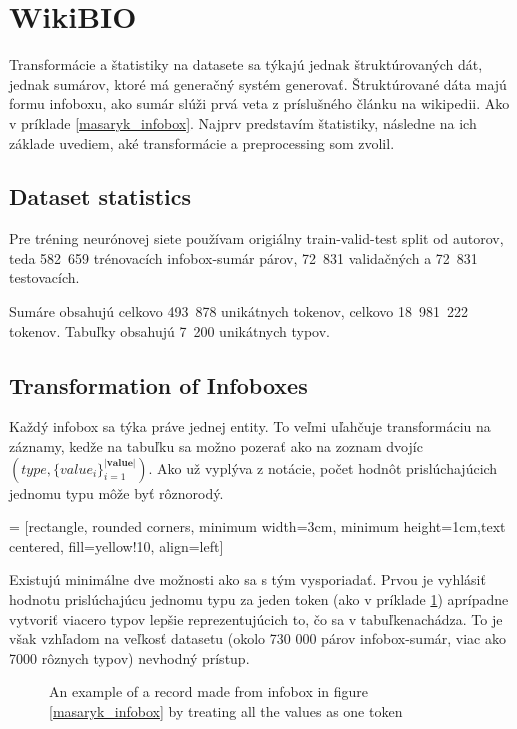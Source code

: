\section{WikiBIO}

Transformácie a štatistiky na datasete sa týkajú jednak štruktúrovaných dát, jednak sumárov, ktoré má generačný systém generovať. Štruktúrované dáta majú formu infoboxu, ako sumár slúži prvá veta z príslušného článku na wikipedii. Ako v príklade \ref{masaryk_infobox}. Najprv predstavím štatistiky, následne na ich základe uvediem, aké transformácie a preprocessing som zvolil.

\subsection{Dataset statistics}

Pre tréning neurónovej siete používam origiálny train-valid-test split od autorov, teda 582~659 trénovacích infobox-sumár párov, 72~831 validačných a 72~831 testovacích.

Sumáre obsahujú celkovo 493~878 unikátnych tokenov, celkovo 18~981~222 tokenov. Tabuľky obsahujú 7~200 unikátnych typov. 

\subsection{Transformation of Infoboxes}

Každý infobox sa týka práve jednej entity. To veľmi uľahčuje transformáciu na záznamy, kedže na tabuľku sa možno pozerať ako na zoznam dvojíc\linebreak[4]$(type, \{value_i\}_{i=1}^{|\mathbf{value}|})$. Ako už vyplýva z notácie, počet hodnôt prislúchajúcich jednomu typu môže byť rôznorodý.

 = [rectangle, rounded corners, minimum width=3cm, minimum height=1cm,text centered, fill=yellow!10, align=left]

Existujú minimálne dve možnosti ako sa s tým vysporiadať. Prvou je vyhlásiť hodnotu prislúchajúcu jednomu typu za jeden token (ako v príklade \ref{onetokenref}) a\linebreak[4]prípadne vytvoriť viacero typov lepšie reprezentujúcich to, čo sa v tabuľke\linebreak[4]nachádza. To je však vzhľadom na veľkosť datasetu (okolo 730 000 párov infobox-sumár, viac ako 7000 rôznych typov) nevhodný prístup.

\begin{figure}[!h]
\centering
\usetikzlibrary{shapes.multipart}
\caption{An example of a record made from infobox in figure \ref{masaryk_infobox} by treating all the values as one token} \label{onetokenref}
\end{figure}

